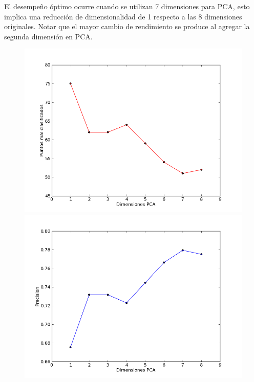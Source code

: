 \documentclass[letter, titlepage, 10pt]{article}
\begin{document}
El desempeño óptimo ocurre cuando se utilizan 7 dimensiones para PCA, esto implica una reducción de dimensionalidad de 1 respecto a las 8 dimensiones originales. Notar que el mayor cambio de rendimiento se produce al agregar la segunda dimensión en PCA. 

\newpage

\begin{figure}[H]
  \centering
    \begin{minipage}{.5\textwidth}
        \centering
        \includegraphics[width=0.8\linewidth]{images/error_pca}
    \end{minipage}%
    \begin{minipage}{.5\textwidth}
        \centering
        \includegraphics[width=0.8\linewidth]{images/precision_pca}
    \end{minipage}
\end{figure}
\end{document}
